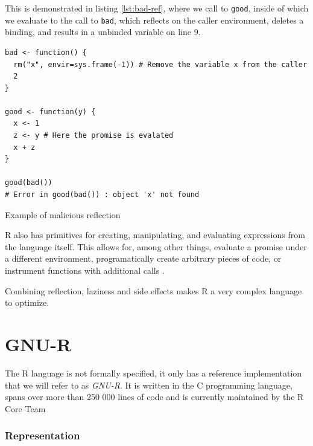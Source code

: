 This is demonstrated in listing \ref{lst:bad-ref}, where we call to \texttt{good}, inside of which we evaluate to the call to \texttt{bad}, which reflects on the caller environment, deletes a binding, and results in a unbinded variable on line 9.

\begin{listing}
	\centering
	\begin{verbatim}
bad <- function() {
  rm("x", envir=sys.frame(-1)) # Remove the variable x from the caller
  2
}

good <- function(y) {
  x <- 1
  z <- y # Here the promise is evalated
  x + z
}

good(bad())
# Error in good(bad()) : object 'x' not found
  \end{verbatim}
	\caption{Example of malicious reflection\todocite}\label{lst:bad-ref}
\end{listing}

R also has primitives for creating, manipulating, and evaluating expressions from the language itself. This allows for, among other things, evaluate a promise under a different environment, programatically create arbitrary pieces of code, or instrument functions with additional calls .

Combining reflection, laziness and side effects makes R a very complex language to optimize.

\newpage
\section{GNU-R}

The R language is not formally specified, it only has a reference implementation that we will refer to as \textit{GNU-R}\todocite. It is written in the C programming language, spans over more than {250 000} lines of code and is currently maintained by the R Core Team

\subsubsection*{Representation}

